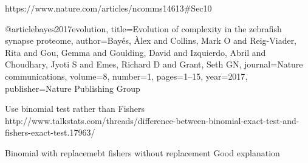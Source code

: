https://www.nature.com/articles/ncomms14613#Sec10

@article{bayes2017evolution,
  title={Evolution of complexity in the zebrafish synapse proteome},
  author={Bay{\'e}s, {\`A}lex and Collins, Mark O and Reig-Viader, Rita and Gou, Gemma and Goulding, David and Izquierdo, Abril and Choudhary, Jyoti S and Emes, Richard D and Grant, Seth GN},
  journal={Nature communications},
  volume={8},
  number={1},
  pages={1--15},
  year={2017},
  publisher={Nature Publishing Group}
}


Use binomial test rather than Fishers
http://www.talkstats.com/threads/difference-between-binomial-exact-test-and-fishers-exact-test.17963/

Binomial with replacemebt fishers without replacement 
Good explanation
